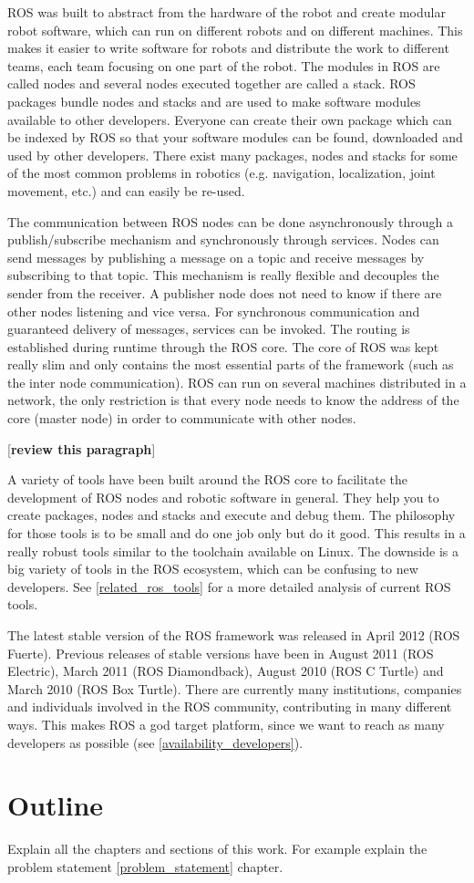 ROS was built to abstract from the hardware of the robot and create modular robot software, which can run on different robots and on different machines. This makes it easier to write software for robots and distribute the work to different teams, each team focusing on one part of the robot. The modules in ROS are called nodes and several nodes executed together are called a stack. ROS packages bundle nodes and stacks and are used to make software modules available to other developers. Everyone can create their own package which can be indexed by ROS so that your software modules can be found, downloaded and used by other developers. There exist many packages, nodes and stacks for some of the most common problems in robotics (e.g. navigation, localization, joint movement, etc.) and can easily be re-used.

The communication between ROS nodes can be done asynchronously through a publish/subscribe mechanism and synchronously through services. Nodes can send messages by publishing a message on a topic and receive messages by subscribing to that topic. This mechanism is really flexible and decouples the sender from the receiver. A publisher node does not need to know if there are other nodes listening and vice versa. For synchronous communication and guaranteed delivery of messages, services can be invoked. The routing is established during runtime through the ROS core. The core of ROS was kept really slim and only contains the most essential parts of the framework (such as the inter node communication). ROS can run on several machines distributed in a network, the only restriction is that every node needs to know the address of the core (master node) in order to communicate with other nodes.

[\textbf{review this paragraph}]

A variety of tools have been built around the ROS core to facilitate the development of ROS nodes and robotic software in general. They help you to create packages, nodes and stacks and execute and debug them. The philosophy for those tools is to be small and do one job only but do it good. This results in a really robust tools similar to the toolchain available on Linux. The downside is a big variety of tools in the ROS ecosystem, which can be confusing to new developers. See \ref{related_ros_tools} for a more detailed analysis of current ROS tools.

The latest stable version of the ROS framework was released in April 2012 (ROS Fuerte). Previous releases of stable versions have been in August 2011 (ROS Electric), March 2011 (ROS Diamondback), August 2010 (ROS C Turtle) and March 2010 (ROS Box Turtle). There are currently many institutions, companies and individuals involved in the ROS community, contributing in many different ways. This makes ROS a god target platform, since we want to reach as many developers as possible (see \ref{availability_developers}).

\section{Outline}
Explain all the chapters and sections of this work. For example explain the problem statement
\ref{problem_statement} chapter.
